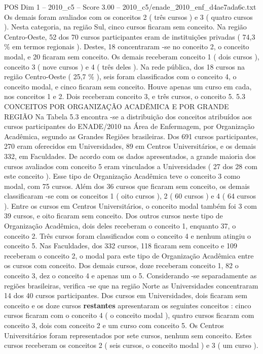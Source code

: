 \begin{textsample}{POS Dim 1 – 2010\_c5 – Score 3.00 – 2010\_c5/enade\_2010\_enf\_d4ae7ada6c.txt}
Os demais foram avaliados com os conceitos 2 ( três cursos ) e 3 ( quatro cursos ).
Nesta categoria, na região Sul, cinco cursos ficaram sem conceito.
Na região Centro-Oeste, 52 dos 70 cursos participantes eram de instituições privadas ( 74,3 \% em termos regionais ).
Destes, 18 concentraram -se no conceito 2, o conceito modal, e 20 ficaram sem conceito.
Os demais receberam conceito 1 ( dois cursos ), conceito 3 ( nove cursos ) e 4 ( três deles ).
Na rede pública, dos 18 cursos na região Centro-Oeste ( 25,7 \% ), seis foram classificados com o conceito 4, o conceito modal, e cinco ficaram sem conceito.
Houve apenas um curso em cada, nos conceitos 1 e 2.
Dois receberam conceito 3, e três cursos, o conceito 5. 5.3 CONCEITOS POR ORGANIZAÇÃO ACADÊMICA E POR GRANDE REGIÃO Na Tabela 5.3 encontra -se a distribuição dos conceitos atribuídos aos cursos participantes do ENADE/2010 na Área de Enfermagem, por Organização Acadêmica, segundo as Grandes Regiões brasileiras.
Dos 691 cursos participantes, 270 eram oferecidos em Universidades, 89 em Centros Universitários, e os demais 332, em Faculdades.
De acordo com os dados apresentados, a grande maioria dos cursos avaliados com conceito 5 eram vinculados a Universidades ( 27 dos 28 com este conceito ).
Esse tipo de Organização Acadêmica teve o conceito 3 como modal, com 75 cursos.
Além dos 36 cursos que ficaram sem conceito, os demais classificaram -se com os conceitos 1 ( oito cursos ), 2 ( 60 cursos ) e 4 ( 64 cursos ).
Entre os cursos em Centros Universitários, o conceito modal também foi 3 com 39 cursos, e oito ficaram sem conceito.
Dos outros cursos neste tipo de Organização Acadêmica, dois deles receberam o conceito 1, enquanto 37, o conceito 2.
Três cursos foram classificados com o conceito 4 e nenhum atingiu o conceito 5.
Nas Faculdades, dos 332 cursos, 118 ficaram sem conceito e 109 receberam o conceito 2, o modal para este tipo de Organização Acadêmica entre os cursos com conceito.
Dos demais cursos, doze receberam conceito 1, 82 o conceito 3, dez o conceito 4 e apenas um o 5.
Considerando -se separadamente as regiões brasileiras, verifica -se que na região Norte as Universidades concentraram 14 dos 40 cursos participantes.
Dos cursos em Universidades, dois ficaram sem conceito e os doze cursos \textbf{restantes} apresentaram os seguintes conceitos : cinco cursos ficaram com o conceito 4 ( o conceito modal ), quatro cursos ficaram com conceito 3, dois com conceito 2 e um curso com conceito 5.
Os Centros Universitários foram representados por sete cursos, nenhum sem conceito.
Estes cursos receberam os conceitos 2 ( seis cursos, o conceito modal ) e 3 ( um curso ).

\end{textsample}
